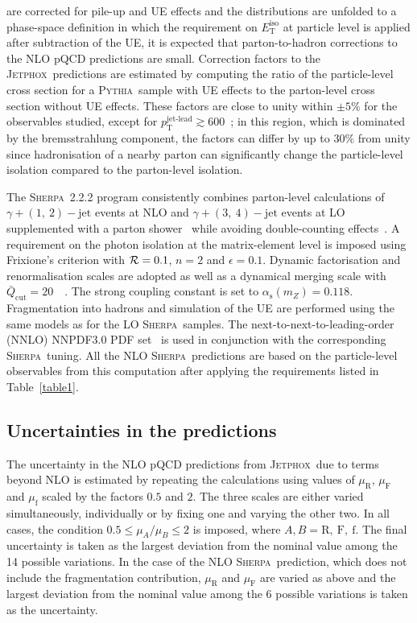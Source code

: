 \documentclass[cernpreprint,texlive=2016,txfonts,UKenglish]{latex/atlasdoc}
\def\ptjetl{p_{\mathrm{T}}^{\text{jet-lead}}}
\def\mz{m_Z}
\def\asz{\alpha_{\mathrm{s}}(\mz)}
\def\muR{\mu_{\mathrm{R}}}
\def\muF{\mu_{\mathrm{F}}}
\def\muf{\mu_{\mathrm{f}}}
\def\etiso{E_{\mathrm{T}}^{\mathrm{iso}}}
\def\sher{{\textsc{Sherpa}}}
\def\pyt{{\textsc{Pythia}}}
\def\jetp{{\textsc{Jetphox}}}
\begin{document}
are corrected for pile-up and UE effects and the distributions are
unfolded to a phase-space definition in which the requirement on
$\etiso$ at particle level is applied after subtraction of the UE, it
is expected that parton-to-hadron corrections to the NLO pQCD
predictions are small. Correction factors to the \jetp\ predictions
are estimated by computing the ratio of the particle-level cross
section for a \pyt\ sample with UE effects to the parton-level cross
section without UE effects. These factors are close to unity within
$\pm 5\%$ for the observables studied, except for $\ptjetl\gtrsim
600$~\GeV; in this region, which is dominated by the bremsstrahlung
component, the factors can differ by up to $30\%$ from unity since
hadronisation of a nearby parton can significantly change the
particle-level isolation compared to the parton-level isolation.

The \sher~2.2.2 program consistently combines parton-level
calculations of $\gamma+ {\mathrm{(1,\ 2)-jet}}$ events at NLO and
$\gamma+{\mathrm{(3,\ 4)-jet}}$ events at
LO~\cite{jhep:0202:044,prl:108:111601} supplemented with a parton
shower~\cite{jhep:0803:038} while avoiding double-counting
effects~\cite{jhep:1304:027}. A requirement on the photon isolation at
the matrix-element level is imposed using Frixione's criterion with
${\cal R}=0.1$, $n=2$ and $\epsilon=0.1$. Dynamic factorisation and
renormalisation scales are adopted as well as a dynamical merging
scale with $\bar Q_{\mathrm{cut}}=20$~\GeV~\cite{jp:g44:044007}. The
strong coupling constant is set to $\asz=0.118$. Fragmentation into
hadrons and simulation of the UE are performed using the same models
as for the LO \sher\ samples. The next-to-next-to-leading-order (NNLO)
NNPDF3.0 PDF set~\cite{jhep:1504:040} is used in conjunction with the
corresponding \sher\ tuning. All the NLO \sher\  predictions are based
on the particle-level observables from this computation after applying
the requirements listed in Table~\ref{table1}.

\FloatBarrier
\subsection{Uncertainties in the predictions}
The uncertainty in the NLO pQCD predictions from \jetp\ due to terms
beyond NLO is estimated by repeating the calculations using values of
$\muR$, $\muF$ and $\muf$ scaled by the factors $0.5$ and $2$. The
three scales  are either varied simultaneously, individually or by
fixing one and varying the other two. In all cases, the condition
$0.5\leq\mu_A/\mu_B\leq 2$ is imposed, where $A,B={\mathrm{R,\ F,\
    f}}$. The final uncertainty is taken as the largest deviation from
the nominal value among the 14 possible variations. In the case of the
NLO \sher\ prediction, which does not include the fragmentation
contribution, $\muR$ and $\muF$ are varied as above and the largest
deviation from the nominal value among the 6 possible variations is
taken as the uncertainty.
\end{document}
